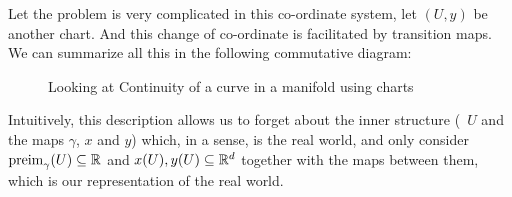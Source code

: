 Let the problem is very complicated in this co-ordinate system, let \((U, y)\) be another chart. And this change of co-ordinate is facilitated by transition maps. We can summarize all this in the following commutative diagram:
\begin{figure}[H]
	\centering
	\caption{Looking at Continuity of a curve in a manifold using charts}
	\label{fig:chart_application_curves}
\end{figure}

Intuitively, this description allows us to forget about the inner structure (\ie\ \(U\) and the maps \(\gamma\), \(x\) and \(y\)) which, in a sense, is the real world, and only consider \(\operatorname{preim}_{\gamma}(U) \subseteq \mathbb R\) and \(x(U), y(U) \subseteq \mathbb R^d\) together with the maps between them, which is our representation of the real world.
